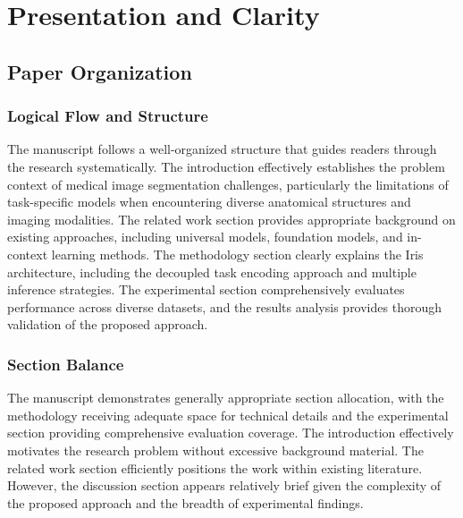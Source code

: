 \section{Presentation and Clarity}
\label{sec:presentation_clarity}

\subsection{Paper Organization}
\subsubsection{Logical Flow and Structure}
The manuscript follows a well-organized structure that guides readers through the research systematically. The introduction effectively establishes the problem context of medical image segmentation challenges, particularly the limitations of task-specific models when encountering diverse anatomical structures and imaging modalities. The related work section provides appropriate background on existing approaches, including universal models, foundation models, and in-context learning methods. The methodology section clearly explains the Iris architecture, including the decoupled task encoding approach and multiple inference strategies. The experimental section comprehensively evaluates performance across diverse datasets, and the results analysis provides thorough validation of the proposed approach.


\subsubsection{Section Balance}
The manuscript demonstrates generally appropriate section allocation, with the methodology receiving adequate space for technical details and the experimental section providing comprehensive evaluation coverage. The introduction effectively motivates the research problem without excessive background material. The related work section efficiently positions the work within existing literature. However, the discussion section appears relatively brief given the complexity of the proposed approach and the breadth of experimental findings. 

